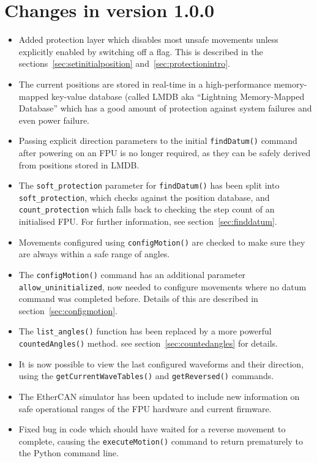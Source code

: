 \documentclass[fontsize=12,a4paper]{scrreprt}
\begin{document}
\section*{Changes in version 1.0.0}
\begin{itemize}
\item Added protection layer which disables most unsafe movements
  unless explicitly enabled by switching off a flag. This is described
  in the sections~\ref{sec:setinitialposition}
  and~\ref{sec:protectionintro}.

\item The current positions are stored in real-time in a
  high-performance memory-mapped key-value database (called LMDB aka
  ``Lightning Memory-Mapped Database'' which has a good amount of
  protection against system failures and even power failure.

\item Passing explicit direction parameters to the initial
  \texttt{findDatum()} command after powering on an FPU is no longer
  required, as they can be safely derived from positions stored in
  LMDB.

\item The \texttt{soft\_protection} parameter for \texttt{findDatum()}
  has been split into \texttt{soft\_protection}, which checks against
  the position database, and \texttt{count\_protection} which falls
  back to checking the step count of an initialised FPU. For further
  information, see section~\ref{sec:finddatum}.

\item Movements configured using \texttt{configMotion()} are checked
  to make sure they are always within a safe range of angles.

\item The \texttt{configMotion()} command has an additional parameter
  \texttt{allow\_uninitialized}, now needed to configure movements
  where no datum command was completed before. Details of this are
  described in section~\ref{sec:configmotion}.

\item The \texttt{list\_angles()} function has been replaced by a more
  powerful \texttt{countedAngles()} method. see
  section~\ref{sec:countedangles} for details.

\item It is now possible to view the last configured waveforms and
  their direction, using the \texttt{getCurrentWaveTables()} and
  \texttt{getReversed()} commands.

\item The EtherCAN simulator has been updated to include new
  information on safe operational ranges of the FPU hardware and
  current firmware.

\item Fixed bug in code which should have waited for a reverse
  movement to complete, causing the \texttt{executeMotion()} command
  to return prematurely to the Python command line.

\end{itemize}
\end{document}
